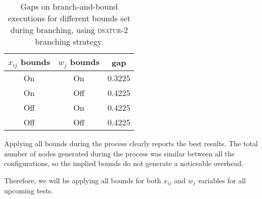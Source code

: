 \begin{table}[h]
\label{table:branch:bounds}
\centering

\begin{tabular}{|c|c|c|}
\hline
$x_{ij}$ bounds & $w_j$ bounds & gap \\
\hline
On & On & 0.3225 \\
On & Off & 0.4225 \\
Off & On & 0.4225 \\
Off & Off & 0.4225 \\
\hline
\end{tabular}

\caption{Gaps on branch-and-bound executions for different bounds set during branching, using \textsc{dsatur-2} branching strategy.}

\end{table}	

Applying all bounds during the process clearly reports the best results. The total number of nodes generated during the process was similar between all the configurations, so the implied bounds do not generate a noticeable overhead. 

Therefore, we will be applying all bounds for both $x_{ij}$ and $w_j$ variables for all upcoming tests.
